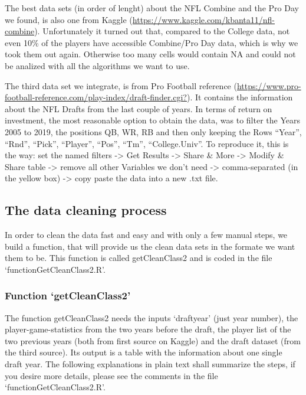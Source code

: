 \documentclass[]{article}
\begin{document}
The best data sets (in order of lenght) about the NFL Combine and the
Pro Day we found, is also one from Kaggle
(\url{https://www.kaggle.com/kbanta11/nfl-combine}). Unfortunately it
turned out that, compared to the College data, not even 10\% of the
players have accessible Combine/Pro Day data, which is why we took them
out again. Otherwise too many cells would contain NA and could not be
analized with all the algorithms we want to use.

The third data set we integrate, is from Pro Football reference
(\url{https://www.pro-football-reference.com/play-index/draft-finder.cgi?}).
It contains the information about the NFL Drafts from the last couple of
years. In terms of return on investment, the most reasonable option to
obtain the data, was to filter the Years 2005 to 2019, the positions QB,
WR, RB and then only keeping the Rows ``Year'', ``Rnd'', ``Pick'',
``Player'', ``Pos'', ``Tm'', ``College.Univ''. To reproduce it, this is
the way: set the named filters -\textgreater{} Get Results
-\textgreater{} Share \& More -\textgreater{} Modify \& Share table
-\textgreater{} remove all other Variables we don't need -\textgreater{}
comma-separated (in the yellow box) -\textgreater{} copy paste the data
into a new .txt file.

\hypertarget{the-data-cleaning-process}{%
\subsection{The data cleaning process}\label{the-data-cleaning-process}}

In order to clean the data fast and easy and with only a few manual
steps, we build a function, that will provide us the clean data sets in
the formate we want them to be. This function is called getCleanClass2
and is coded in the file `functionGetCleanClass2.R'.

\hypertarget{function-getcleanclass2}{%
\subsubsection{Function
`getCleanClass2'}\label{function-getcleanclass2}}

The function getCleanClass2 needs the inputs `draftyear' (just year
number), the player-game-statistics from the two years before the draft,
the player list of the two previous years (both from first source on
Kaggle) and the draft dataset (from the third source). Its output is a
table with the information about one single draft year. The following
explanations in plain text shall summarize the steps, if you desire more
details, please see the comments in the file `functionGetCleanClass2.R'.
\end{document}
